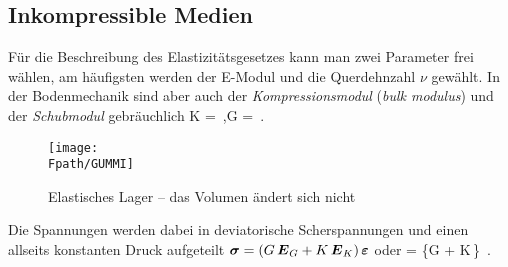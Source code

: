 {{%
{\textcolor{sectionTitleBlue}{\section{Inkompressible Medien}}}\label{Inkompressible Medien}
F\"{u}r die Beschreibung des Elastizit\"{a}tsgesetzes kann man zwei Parameter frei w\"{a}hlen, am h\"{a}ufigsten werden der E-Modul und die Querdehnzahl $\nu$ gew\"{a}hlt. In der Bodenmechanik sind aber auch der {\em Kompressionsmodul\/} ({\em bulk modulus\/}) und der {\em Schubmodul\/} gebr\"{a}uchlich
\bfo
K = \,,\qquad G = \,.
\efo
\begin{figure}[tbp] \centering
\if {} \sidecaption \fi
\texttt{[image: \\Fpath/GUMMI]}
\caption{Elastisches Lager -- das Volumen \"{a}ndert sich nicht}\label{Gummi}
\end{figure}%

Die Spannungen werden dabei in deviatorische Scherspannungen und einen allseits konstanten Druck aufgeteilt $\mbox{\boldmath $\sigma$} = (G\,\mbox{\boldmath $E$}_G + K\,\mbox{\boldmath $E$}_K)\,\mbox{\boldmath $\varepsilon$}$ oder
\bfoo
{} = \left \{G  + K\,\right\} \,.
\efoo

}}
